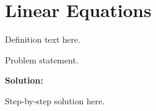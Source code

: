 \section{Linear Equations}


\begin{definition}[Term]
Definition text here.
\end{definition}

\begin{example}
Problem statement.

\textbf{Solution:}

Step-by-step solution here.
\end{example}
